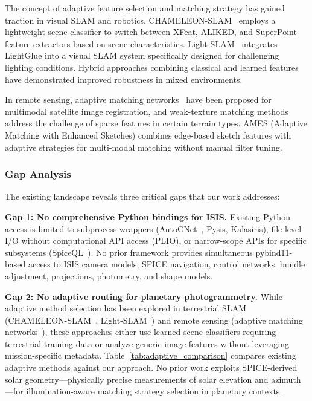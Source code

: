 \documentclass[lettersize,journal]{IEEEtran}
\begin{document}
The concept of adaptive feature selection and matching strategy has gained traction in visual SLAM and robotics. CHAMELEON-SLAM~\cite{syed2026chameleon} employs a lightweight scene classifier to switch between XFeat, ALIKED, and SuperPoint feature extractors based on scene characteristics. Light-SLAM~\cite{lightslam2024} integrates LightGlue into a visual SLAM system specifically designed for challenging lighting conditions. Hybrid approaches combining classical and learned features~\cite{hybrid2026} have demonstrated improved robustness in mixed environments.

In remote sensing, adaptive matching networks~\cite{adaptive2023} have been proposed for multimodal satellite image registration, and weak-texture matching methods~\cite{weaktexture2023} address the challenge of sparse features in certain terrain types. AMES (Adaptive Matching with Enhanced Sketches) combines edge-based sketch features with adaptive strategies for multi-modal matching without manual filter tuning.

\subsubsection*{Gap Analysis}

The existing landscape reveals three critical gaps that our work addresses:

\textbf{Gap 1: No comprehensive Python bindings for ISIS.} Existing Python access is limited to subprocess wrappers (AutoCNet~\cite{laura2018autocnet}, Pysis, Kalasiris), file-level I/O without computational API access (PLIO), or narrow-scope APIs for specific subsystems (SpiceQL~\cite{usgs2024spiceql}). No prior framework provides simultaneous pybind11-based access to ISIS camera models, SPICE navigation, control networks, bundle adjustment, projections, photometry, and shape models.

\textbf{Gap 2: No adaptive routing for planetary photogrammetry.} While adaptive method selection has been explored in terrestrial SLAM (CHAMELEON-SLAM~\cite{syed2026chameleon}, Light-SLAM~\cite{lightslam2024}) and remote sensing (adaptive matching networks~\cite{adaptive2023}), these approaches either use learned scene classifiers requiring terrestrial training data or analyze generic image features without leveraging mission-specific metadata. Table~\ref{tab:adaptive_comparison} compares existing adaptive methods against our approach. No prior work exploits SPICE-derived solar geometry---physically precise measurements of solar elevation and azimuth---for illumination-aware matching strategy selection in planetary contexts.
\end{document}
